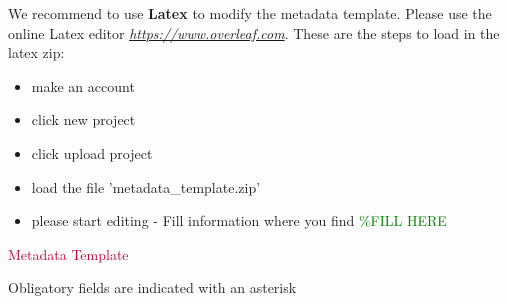 \documentclass[12pt]{article}
\begin{document}
We recommend to use \textbf{Latex} to modify the metadata template. Please use the online Latex editor \textit{\textcolor[HTML]{BC0031}{\href{https://www.overleaf.com}{https://www.overleaf.com}}}. These are the steps to load in the latex zip:
\begin{itemize}
  \item make an account
  \item click new project 
  \item click upload project
  \item load the file 'metadata\_template.zip'
  \item please start editing - Fill information where you find \textcolor[HTML]{008000}{\%FILL HERE}
\end{itemize}
\newline

\newpage 



{\fontsize{18pt}{21.6pt}\selectfont \textcolor[HTML]{BC0031}{Metadata Template}\par}\par

\vspace{\baselineskip}{\fontsize{14pt}{16.8pt}\selectfont \textcolor[HTML]{BC0031}{General Description}\par}\par
\label{sec:dataset1}

Obligatory fields are indicated with an asterisk 

\label{sec:generaldescription}
\end{document}
